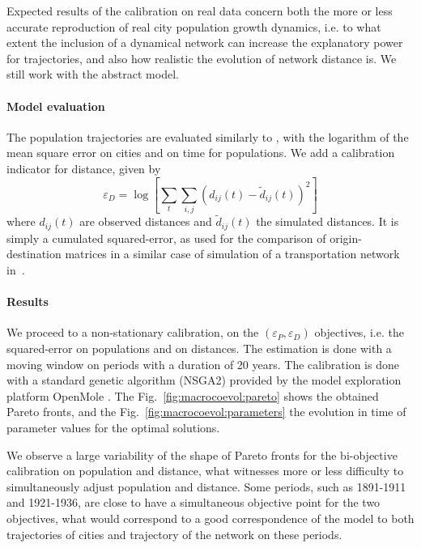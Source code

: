 \documentclass[11pt]{article}
\begin{document}
Expected results of the calibration on real data concern both the more or less accurate reproduction of real city population growth dynamics, i.e. to what extent the inclusion of a dynamical network can increase the explanatory power for trajectories, and also how realistic the evolution of network distance is. We still work with the abstract model.


\paragraph{Model evaluation}


The population trajectories are evaluated similarly to \cite{raimbault2018indirect}, with the logarithm of the mean square error on cities and on time for populations. We add a calibration indicator for distance, given by
\[
\varepsilon_D = \log \left[ \sum_t \sum_{i,j} \left(d_{ij}(t) - \tilde{d}_{ij}(t)\right)^2\right]
\]
where $d_{ij}(t)$ are observed distances and $\tilde{d}_{ij}(t)$ the simulated distances. It is simply a cumulated squared-error, as used for the comparison of origin-destination matrices in a similar case of simulation of a transportation network in~\cite{jacobs2016transport}.



\paragraph{Results}

We proceed to a non-stationary calibration, on the $(\varepsilon_P,\varepsilon_D)$ objectives, i.e. the squared-error on populations and on distances. The estimation is done with a moving window on periods with a duration of 20 years. The calibration is done with a standard genetic algorithm (NSGA2) provided by the model exploration platform OpenMole \citep{reuillon2013openmole}. The Fig.~\ref{fig:macrocoevol:pareto} shows the obtained Pareto fronts, and the Fig.~\ref{fig:macrocoevol:parameters} the evolution in time of parameter values for the optimal solutions.

We observe a large variability of the shape of Pareto fronts for the bi-objective calibration on population and distance, what witnesses more or less difficulty to simultaneously adjust population and distance. Some periods, such as 1891-1911 and 1921-1936, are close to have a simultaneous objective point for the two objectives, what would correspond to a good correspondence of the model to both trajectories of cities and trajectory of the network on these periods. 
\end{document}
